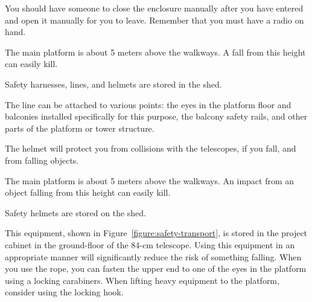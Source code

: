 
You should have someone to close the enclosure manually after you have entered and open it manually for you to leave. Remember that you must have a radio on hand.


The main platform is about 5 meters above the walkways. A fall from this height can easily kill.

Safety harnesses, lines, and helmets are stored in the shed.

The line can be attached to various points: the eyes in the platform floor and balconies installed specifically for this purpose, the balcony safety rails, and other parts of the platform or tower structure.

The helmet will protect you from collisions with the telescopes, if you fall, and from falling objects.


The main platform is about 5 meters above the walkways. An impact from an object falling from this height can easily kill.

Safety helmets are stored on the shed.


This equipment, shown in Figure~\ref{figure:safety-transport}, is stored in the project cabinet in the ground-floor of the 84-cm telescope. Using this equipment in an appropriate manner will significantly reduce the risk of something falling. When you use the rope, you can fasten the upper end to one of the eyes in the platform using a locking carabiners. When lifting heavy equipment to the platform, consider using the locking hook.

